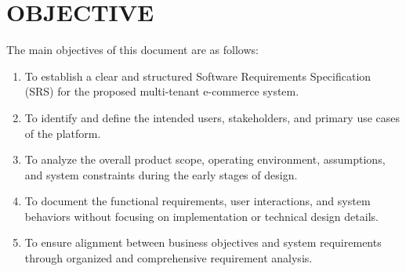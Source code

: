 \chapter{OBJECTIVE}\label{obj}

The main objectives of this document are as follows:
\begin{enumerate}
    \item To establish a clear and structured Software Requirements Specification (SRS) for the proposed multi-tenant e-commerce system.
    \item To identify and define the intended users, stakeholders, and primary use cases of the platform.
    \item To analyze the overall product scope, operating environment, assumptions, and system constraints during the early stages of design.
    \item To document the functional requirements, user interactions, and system behaviors without focusing on implementation or technical design details.
    \item To ensure alignment between business objectives and system requirements through organized and comprehensive requirement analysis.
\end{enumerate}

\clearpage
